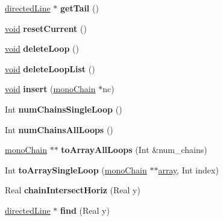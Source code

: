 \begin{DoxyCompactItemize}
\hyperlink{classdirected_line}{directed\+Line} $\ast$ {\bfseries get\+Tail} ()
\item 
\mbox{\label{classmono_chain_a509f0bb1034f5d40500c3e9f03de05a3}} 
\hyperlink{interfacevoid}{void} {\bfseries reset\+Current} ()
\item 
\mbox{\label{classmono_chain_ad24a192735ee72e79959c1ac87c744ca}} 
\hyperlink{interfacevoid}{void} {\bfseries delete\+Loop} ()
\item 
\mbox{\label{classmono_chain_afeac08797f19b9ba5086d838726e508e}} 
\hyperlink{interfacevoid}{void} {\bfseries delete\+Loop\+List} ()
\item 
\mbox{\label{classmono_chain_a8ec5720eb7aae0344775cac935aa624d}} 
\hyperlink{interfacevoid}{void} {\bfseries insert} (\hyperlink{classmono_chain}{mono\+Chain} $\ast$nc)
\item 
\mbox{\label{classmono_chain_aa62b226c1a508592bb8a7e8a1e6cb3cf}} 
Int {\bfseries num\+Chains\+Single\+Loop} ()
\item 
\mbox{\label{classmono_chain_a9f66e11dc1b3c7811c1762057d8378a9}} 
Int {\bfseries num\+Chains\+All\+Loops} ()
\item 
\mbox{\label{classmono_chain_a4ee5dac2d29724e6ab40d401d0c9823d}} 
\hyperlink{classmono_chain}{mono\+Chain} $\ast$$\ast$ {\bfseries to\+Array\+All\+Loops} (Int \&num\+\_\+chains)
\item 
\mbox{\label{classmono_chain_a7e33d04ea8921076a266c1cd30e4ae00}} 
Int {\bfseries to\+Array\+Single\+Loop} (\hyperlink{classmono_chain}{mono\+Chain} $\ast$$\ast$\hyperlink{structarray}{array}, Int index)
\item 
\mbox{\label{classmono_chain_a0b92bf5719f821797e8be28305253a01}} 
Real {\bfseries chain\+Intersect\+Horiz} (Real y)
\item 
\mbox{\label{classmono_chain_a4891963bba85a03f2675ce7a41909a82}} 
\hyperlink{classdirected_line}{directed\+Line} $\ast$ {\bfseries find} (Real y)
\item 

\end{DoxyCompactItemize}
